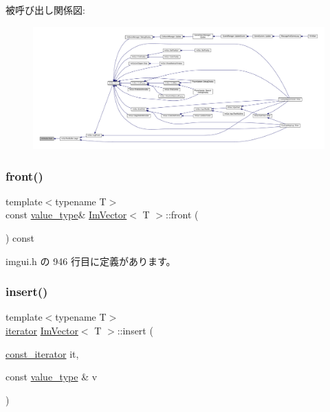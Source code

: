 被呼び出し関係図\+:
\nopagebreak
\begin{figure}[H]
\begin{center}
\leavevmode
\includegraphics[width=350pt]{class_im_vector_a5b0108d6b1a4a11609723f8305fb9011_icgraph}
\end{center}
\end{figure}
\mbox{\label{class_im_vector_a76dc6bb045574ba79b15a1941b662597}} 
\subsubsection{\texorpdfstring{front()}{front()}\hspace{0.1cm}{\footnotesize\ttfamily [2/2]}}
{\footnotesize\ttfamily template$<$typename T$>$ \\
const \mbox{\hyperlink{class_im_vector_a8bd77e4e7581d8e5f9e98d7c2f3c2a80}{value\+\_\+type}}\& \mbox{\hyperlink{class_im_vector}{Im\+Vector}}$<$ T $>$\+::front (\begin{DoxyParamCaption}{ }\end{DoxyParamCaption}) const\hspace{0.3cm}{\ttfamily [inline]}}



 imgui.\+h の 946 行目に定義があります。

\mbox{\label{class_im_vector_a52fdb731c13c82a1fd971186c6a701b5}} 
\subsubsection{\texorpdfstring{insert()}{insert()}}
{\footnotesize\ttfamily template$<$typename T$>$ \\
\mbox{\hyperlink{class_im_vector_a74b5478f1f6fd471cc71219bce483db6}{iterator}} \mbox{\hyperlink{class_im_vector}{Im\+Vector}}$<$ T $>$\+::insert (\begin{DoxyParamCaption}\item[{\mbox{\hyperlink{class_im_vector_aedeac9c5080f9d6ce96ae837768ee4c4}{const\+\_\+iterator}}}]{it,  }\item[{const \mbox{\hyperlink{class_im_vector_a8bd77e4e7581d8e5f9e98d7c2f3c2a80}{value\+\_\+type}} \&}]{v }\end{DoxyParamCaption})\hspace{0.3cm}{\ttfamily [inline]}}



